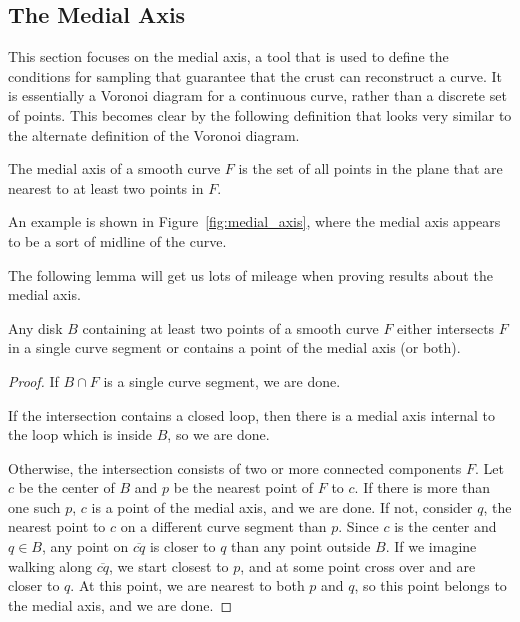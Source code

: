 \subsection{The Medial Axis}

This section focuses on the medial axis, a tool that is used to define the conditions for sampling that guarantee that the crust can reconstruct a curve.
It is essentially a Voronoi diagram for a continuous curve, rather than a discrete set of points.
This becomes clear by the following definition that looks very similar to the alternate definition of the Voronoi diagram.


\begin{definition}
	The medial axis of a smooth curve $F$ is the set of all points in the plane that are nearest to at least two points in $F$.
\end{definition}



An example is shown in Figure~\ref{fig:medial_axis}, where the medial axis appears to be a sort of midline of the curve.

The following lemma will get us lots of mileage when proving results about the medial axis.

\begin{lemma}
	Any disk $B$ containing at least two points of a smooth curve $F$ either intersects $F$ in a single curve segment or contains a point of the medial axis (or both).
	\label{lem:single_curve_segment}
\end{lemma}

\begin{proof}
	If $B\cap F$ is a single curve segment, we are done.

	If the intersection contains a closed loop, then there is a medial axis internal to the loop which is inside $B$, so we are done.

	Otherwise, the intersection consists of two or more connected components $F$.
	Let $c$ be the center of $B$ and $p$ be the nearest point of $F$ to $c$.
	If there is more than one such $p$, $c$ is a point of the medial axis, and we are done.
	If not, consider $q$, the nearest point to $c$ on a different curve segment than $p$.
	Since $c$ is the center and $q\in B$, any point on $\overline{cq}$ is closer to $q$ than any point outside $B$.
	If we imagine walking along $\overline{cq}$, we start closest to $p$, and at some point cross over and are closer to $q$.
	At this point, we are nearest to both $p$ and $q$, so this point belongs to the medial axis, and we are done.
\end{proof}

